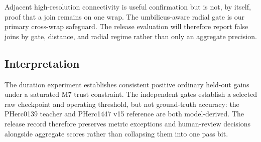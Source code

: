 Adjacent high-resolution connectivity is useful confirmation but is not, by
itself, proof that a join remains on one wrap.
The umbilicus-aware radial gate is our primary cross-wrap safeguard.
The release evaluation will therefore report false joins by gate, distance, and
radial regime rather than only an aggregate precision.

\subsection{Interpretation}

The duration experiment establishes consistent positive ordinary held-out gains
under a saturated M7 trust constraint. The independent gates establish a
selected raw checkpoint and operating threshold, but not ground-truth accuracy:
the PHerc0139 teacher and PHerc1447 v15 reference are both model-derived. The
release record therefore preserves metric exceptions and human-review decisions
alongside aggregate scores rather than collapsing them into one pass bit.
